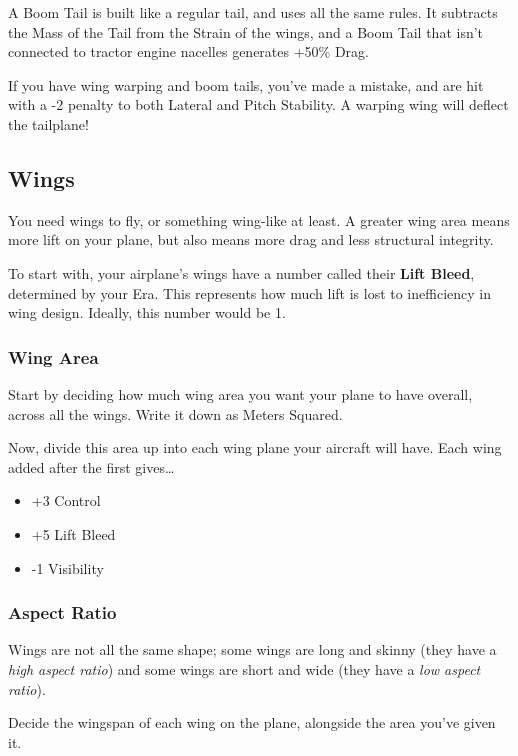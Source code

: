 \documentclass{article}
\begin{document}
A Boom Tail is built like a regular tail, and uses all the same rules.
It subtracts the Mass of the Tail from the Strain of the wings, and a
Boom Tail that isn't connected to tractor engine nacelles generates
+50\% Drag.

If you have wing warping and boom tails, you've made a mistake, and are
hit with a -2 penalty to both Lateral and Pitch Stability. A warping
wing will deflect the tailplane!

\subsection{Wings}
\label{_Wings}

You need wings to fly, or something wing-like at least. A greater wing
area means more lift on your plane, but also means more drag and less
structural integrity.

To start with, your airplane's wings have a number called their
\textbf{Lift Bleed}, determined by your Era. This represents how much
lift is lost to inefficiency in wing design. Ideally, this number would
be 1.

\subsubsection{Wing Area}
\label{_Wing_Area}

Start by deciding how much wing area you want your plane to have
overall, across all the wings. Write it down as Meters Squared.

Now, divide this area up into each wing plane your aircraft will have.
Each wing added after the first gives\ldots{}

\begin{itemize}
    \item          +3 Control
    \item          +5 Lift Bleed
    \item          -1 Visibility
\end{itemize}

\subsubsection{Aspect Ratio}
\label{_Aspect Ratio}

Wings are not all the same shape; some wings are long and skinny (they
have a \emph{high aspect ratio}) and some wings are short and wide (they
have a \emph{low aspect ratio}).

Decide the wingspan of each wing on the plane, alongside the area you've
given it.
\end{document}
